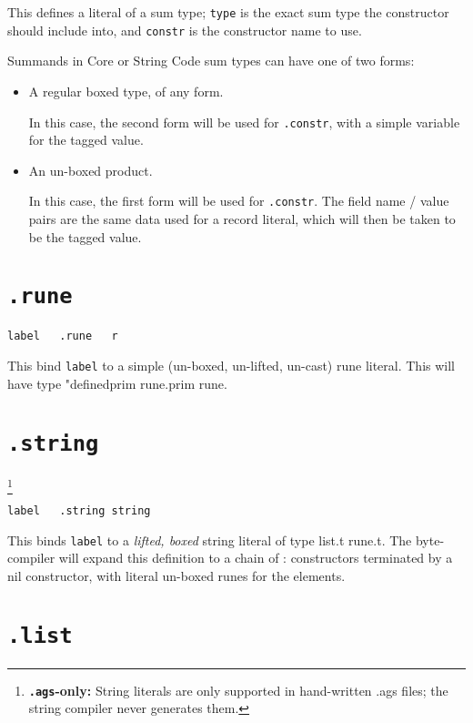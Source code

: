 \documentclass{report}
\newcommand\stringcode[1]{\texttt{#1}}
\newcommand\agsonly[1]{\footnote{\textbf{\texttt{.ags}-only: }#1}}
\begin{document}
This defines a literal of a sum type;
\stringcode{type} is the exact sum type the constructor should include into,
and \stringcode{constr} is the constructor name to use.

Summands in Core or String Code sum types can have one of two forms:
\begin{itemize}
    \item A regular boxed type, of any form.

        In this case, the second form will be used for \stringcode{.constr}, with a simple variable for the tagged value.

    \item An un-boxed product.

        In this case, the first form will be used for \stringcode{.constr}.
        The field name / value pairs are the same data used for a record literal, which will then be taken to be the tagged value.
\end{itemize}

\section{\stringcode{.rune}}

\begin{verbatim}
label	.rune	r
\end{verbatim}

This bind \stringcode{label} to a simple (un-boxed, un-lifted, un-cast) rune literal.
This will have type \<"definedprim rune.prim rune\>.

\section{\stringcode{.string}}

\agsonly{String literals are only supported in hand-written .ags files; the string compiler never generates them.}

\begin{verbatim}
label	.string	string
\end{verbatim}

This binds \stringcode{label} to a \emph{lifted, boxed} string literal of type \<list.t rune.t\>.
The byte-compiler will expand this definition to a chain of \<:\> constructors terminated by a \<nil\> constructor,
with literal un-boxed runes for the elements.

\section{\stringcode{.list}}
\end{document}
